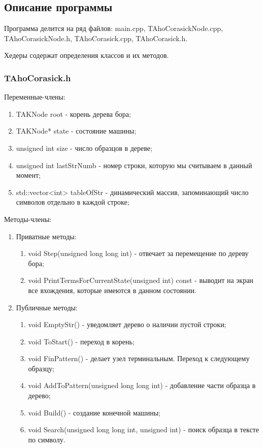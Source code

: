\documentclass[12pt]{article}
\begin{document}
\subsection*{Описание программы}

Программа делится на ряд файлов: main.cpp, TAhoCorasickNode.cpp, TAhoCorasickNode.h, TAhoCorasick.cpp, TAhoCorasick.h. 

Хедеры содержат определения классов и их методов.

\subsubsection*{TAhoCorasick.h}

Переменные-члены:
\begin{enumerate}
	\item TAKNode root - корень дерева бора;
	\item TAKNode* state - состояние машины;
	\item unsigned int size - число образцов в дереве;
	\item unsigned int lastStrNumb - номер строки, которую мы считываем в данный момент;
	\item std::vector<int> tableOfStr - динамический массив, запоминающий число символов отдельно в каждой строке;
\end{enumerate}

Методы-члены:
\begin{enumerate}
	\item Приватные методы:
	\begin{enumerate}
		\item void Step(unsigned long long int) - отвечает за перемещение по дереву бора;
		\item void PrintTermsForCurrentState(unsigned int) const - выводит на экран все вхождения, которые имеются в данном состоянии.
	\end{enumerate}
	\item Публичные методы:
	\begin{enumerate}
		\item void EmptyStr() - уведомляет дерево о наличии пустой строки;
		\item void ToStart() - переход в корень;
		\item void FinPattern() - делает узел терминальным. Переход к следующему образцу;
		\item void AddToPattern(unsigned long long int) - добавление части образца в дерево;
		\item void Build() - создание конечной машины;
		\item void Search(unsigned long long int, unsigned int) - поиск образца в тексте по символу.
	\end{enumerate}
\end{enumerate}
\end{document}
